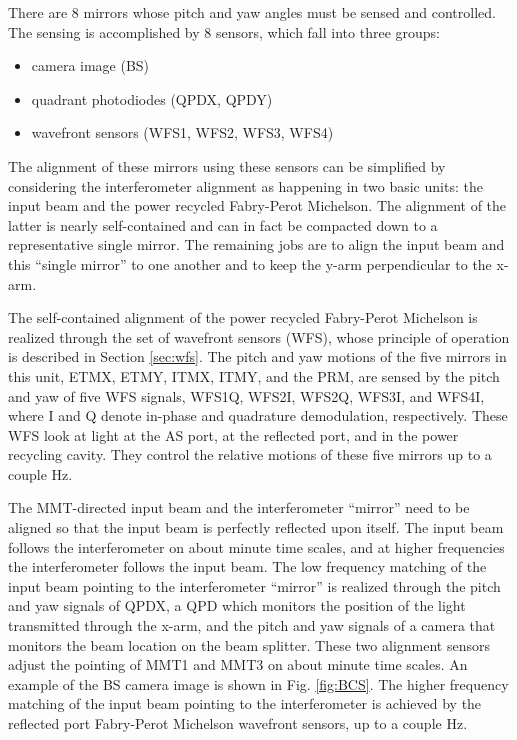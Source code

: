 There are 8 mirrors whose pitch and yaw angles must be sensed and controlled. The sensing is accomplished by 8 sensors, which fall into three groups:
\begin{itemize}
\item camera image (BS)  \vspace{-10pt}
\item quadrant photodiodes (QPDX, QPDY) \vspace{-10pt}
\item wavefront sensors (WFS1, WFS2, WFS3, WFS4)
\end{itemize}
The alignment of these mirrors using these sensors can be simplified by considering the interferometer alignment as happening in two basic units: the input beam and the power recycled Fabry-Perot Michelson. The alignment of the latter is nearly self-contained and can in fact be compacted down to a representative single mirror. The remaining jobs are to align the input beam and this ``single mirror'' to one another and to keep the y-arm perpendicular to the x-arm.

The self-contained alignment of the power recycled Fabry-Perot Michelson is realized through the set of wavefront sensors (WFS), whose principle of operation is described in Section \ref{sec:wfs}. The pitch and yaw motions of the five mirrors in this unit, ETMX, ETMY, ITMX, ITMY, and the PRM, are sensed by the pitch and yaw of five WFS signals, WFS1Q, WFS2I, WFS2Q, WFS3I, and WFS4I, where I and Q denote in-phase and quadrature demodulation, respectively. These WFS look at light at the AS port, at the reflected port, and in the power recycling cavity. They control the relative motions of these five mirrors up to a couple Hz. 

The MMT-directed input beam and the interferometer ``mirror'' need to be aligned so that the input beam is perfectly reflected upon itself. The input beam follows the interferometer on about minute time scales, and at higher frequencies the interferometer follows the input beam. The low frequency matching of the input beam pointing to the interferometer ``mirror'' is realized through the pitch and yaw signals of QPDX, a QPD which monitors the position of the light transmitted through the x-arm, and the pitch and yaw signals of a camera that monitors the beam location on the beam splitter. These two alignment sensors adjust the pointing of MMT1 and MMT3 on about minute time scales. An example of the BS camera image is shown in Fig. \ref{fig:BCS}. The higher frequency matching of the input beam pointing to the interferometer is achieved by the reflected port Fabry-Perot Michelson wavefront sensors, up to a couple Hz.

